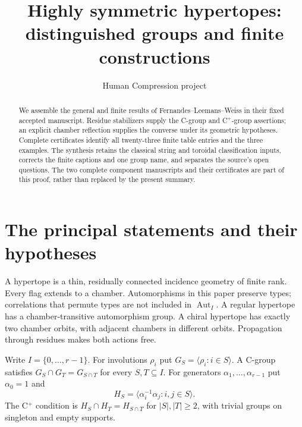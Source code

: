 \documentclass[11pt,a4paper]{article}
\title{Highly symmetric hypertopes: distinguished groups and finite constructions}
\author{Human Compression project}\date{}
\newcommand{\gen}[1]{\langle#1\rangle}\newcommand{\Aut}{\operatorname{Aut}}
\begin{document}
\maketitle
\begin{abstract}
We assemble the general and finite results of Fernandes--Leemans--Weiss in
their fixed accepted manuscript. Residue stabilizers supply the C-group and
C$^+$-group assertions; an explicit chamber reflection supplies the converse
under its geometric hypotheses. Complete certificates identify all twenty-three
finite table entries and the three examples. The synthesis retains the
classical string and toroidal classification inputs, corrects the finite
captions and one group name, and separates the source's open questions.
The two complete component manuscripts and their certificates are part of
this proof, rather than replaced by the present summary.
\end{abstract}

\section{The principal statements and their hypotheses}
A hypertope is a thin, residually connected incidence geometry of finite
rank. Every flag extends to a chamber. Automorphisms in this paper preserve
types; correlations that permute types are not included in $\Aut_I$.
A regular hypertope has a chamber-transitive automorphism group. A chiral
hypertope has exactly two chamber orbits, with adjacent chambers in
different orbits. Propagation through residues makes both actions free.

Write $I=\{0,\ldots,r-1\}$. For involutions $\rho_i$ put
$G_S=\gen{\rho_i:i\in S}$. A C-group satisfies
$G_S\cap G_T=G_{S\cap T}$ for every $S,T\subseteq I$.
For generators $\alpha_1,\ldots,\alpha_{r-1}$ put $\alpha_0=1$ and
\[
 H_S=\gen{\alpha_i^{-1}\alpha_j:i,j\in S}.
\]
The C$^+$ condition is $H_S\cap H_T=H_{S\cap T}$ for
$|S|,|T|\ge2$, with trivial groups on singleton and empty supports.
\end{document}
